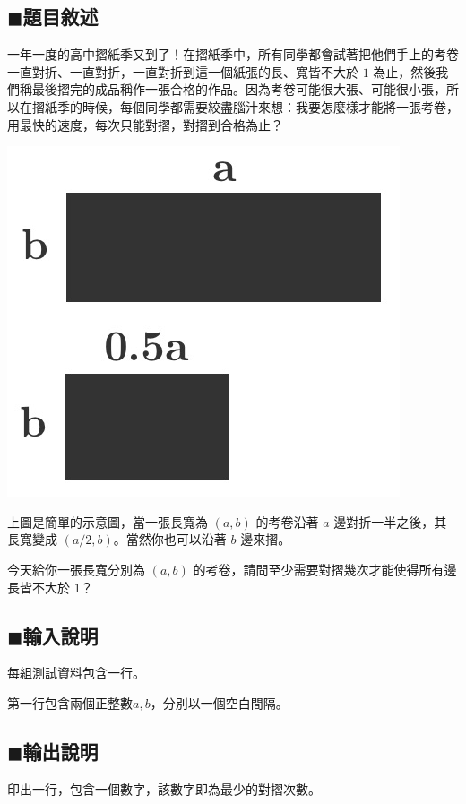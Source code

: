 \documentclass[12pt,a4paper]{article}
\begin{document}
\subsection*{$\blacksquare$題目敘述}

一年一度的高中摺紙季又到了！在摺紙季中，所有同學都會試著把他們手上的考卷一直對折、一直對折，一直對折到這一個紙張的長、寬皆不大於 $1$ 為止，然後我們稱最後摺完的成品稱作一張合格的作品。因為考卷可能很大張、可能很小張，所以在摺紙季的時候，每個同學都需要絞盡腦汁來想：我要怎麼樣才能將一張考卷，用最快的速度，每次只能對摺，對摺到合格為止？

\begin{center}
\includegraphics[scale=0.5]{1-1.jpg}
\end{center}

上圖是簡單的示意圖，當一張長寬為 $(a, b)$ 的考卷沿著 $a$ 邊對折一半之後，其長寬變成 $(a/2, b)$。當然你也可以沿著 $b$ 邊來摺。

今天給你一張長寬分別為 $(a, b)$ 的考卷，請問至少需要對摺幾次才能使得所有邊長皆不大於 $1$？

\subsection*{$\blacksquare$輸入說明}
每組測試資料包含一行。\par
第一行包含兩個正整數\(a,b\)，分別以一個空白間隔。\par

\subsection*{$\blacksquare$輸出說明}
印出一行，包含一個數字，該數字即為最少的對摺次數。\\
\end{document}
